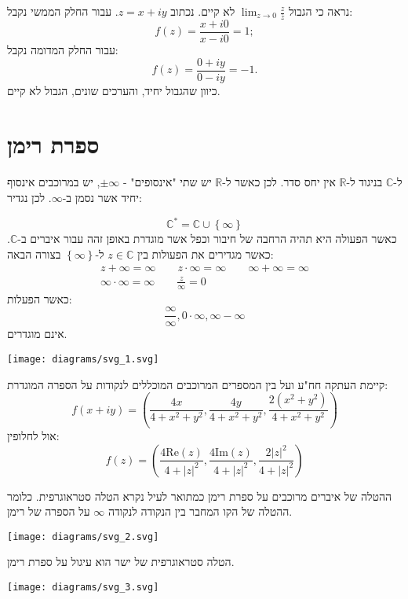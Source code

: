 \documentclass{tstextbook}
\begin{document}
\begin{example}
נראה כי הגבול \(\operatorname*{lim}_{z\to0}{\frac{z}{\overline{{z}}}}\) לא קיים. נכתוב \(z=x+iy\). עבור החלק הממשי נקבל:
$$f(z)={\frac{x+i0}{x-i0}}=1;$$
עבור החלק המדומה נקבל:
$$f(z)={\frac{0+i y}{0-i y}}=-1.$$
כיוון שהגבול יחיד, והערכים שונים, הגבול לא קיים.

\end{example}
\section{ספרת רימן}

ל-\(\mathbb{C}\) בניגוד ל-\(\mathbb{R}\) אין יחס סדר. לכן כאשר ל-\(\mathbb{R}\) יש שתי "אינסופים" - \(\pm\infty\), יש במרוכבים אינסוף יחיד אשר נסמן ב-\(\infty\). לכן נגדיר:

\begin{definition}
$$\mathbb{C}^*=\mathbb{C}\cup \left\{  \infty  \right\}$$
כאשר הפעולה היא תהיה הרחבה של חיבור וכפל אשר מוגדרת באופן זהה עבור איברים ב-\(\mathbb{C}\). כאשר מגדירים את הפעולות בין \(z\in \mathbb{C}\) ל-\(\left\{  \infty   \right\}\) בצורה הבאה:
\begin{gather*}z+\infty=\infty \qquad z\cdot \infty=\infty \qquad \infty+\infty=\infty \\\infty\cdot \infty=\infty \qquad \frac{z}{\infty}=0 
\end{gather*}
כאשר הפעלות:
$$\frac{\infty}{\infty},0\cdot \infty,\infty-\infty$$
אינם מוגדרים.

\end{definition}
\texttt{[image: diagrams/svg\_1.svg]}
\begin{proposition}
קיימת העתקה חח"ע ועל בין המספרים המרוכבים המוכללים לנקודות על הספרה המוגדרת:
$$f(x+iy)=\left( \frac{4x}{4+x^2+y^2},\frac{4y}{4+x^2+y^2},\frac{2(x^2+y^2)}{4+x^2+y^2} \right)$$
אול לחלופין:
$$f(z)=\left( \frac{4\mathrm{Re}(z)}{4+\lvert z \rvert ^2},\frac{4\mathrm{Im}(z)}{4+\lvert z \rvert ^2},\frac{2\lvert z \rvert ^2}{4+\lvert z \rvert ^2} \right)$$

\end{proposition}
\begin{definition}
ההטלה של איברים מרוכבים על ספרת רימן כמתואר לעיל נקרא הטלה סטראוגרפית. כלומר ההטלה של הקו המחבר בין הנקודה לנקודה \(\infty\) על הספרה של רימן.

\end{definition}
\texttt{[image: diagrams/svg\_2.svg]}
\begin{proposition}
הטלה סטראוגרפית של ישר הוא עיגול על ספרת רימן.

\texttt{[image: diagrams/svg\_3.svg]}
\end{proposition}
\end{document}

